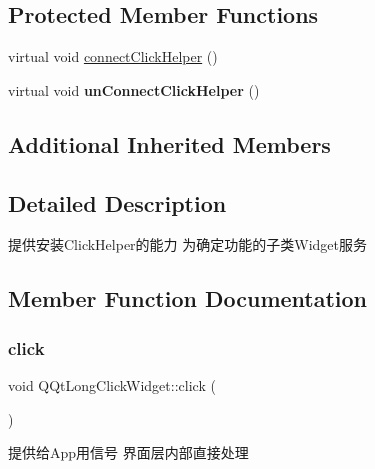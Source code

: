 \subsection*{Protected Member Functions}
\begin{DoxyCompactItemize}
\item 
virtual void \mbox{\hyperlink{class_q_qt_long_click_widget_acd01d09ecce47c27d46173fe552799cb}{connect\+Click\+Helper}} ()
\item 
\mbox{\label{class_q_qt_long_click_widget_a3b4240f8c33cd2fe51287b06e91f37ff}} 
virtual void {\bfseries un\+Connect\+Click\+Helper} ()
\end{DoxyCompactItemize}
\subsection*{Additional Inherited Members}


\subsection{Detailed Description}
提供安装\+Click\+Helper的能力 为确定功能的子类\+Widget服务 

\subsection{Member Function Documentation}
\mbox{\label{class_q_qt_long_click_widget_ab4994923edc5e1b1ac3c70ad122f496e}} 
\subsubsection{\texorpdfstring{click}{click}}
{\footnotesize\ttfamily void Q\+Qt\+Long\+Click\+Widget\+::click (\begin{DoxyParamCaption}{ }\end{DoxyParamCaption})\hspace{0.3cm}{\ttfamily [signal]}}

提供给\+App用信号 界面层内部直接处理 \mbox{\label{class_q_qt_long_click_widget_acd01d09ecce47c27d46173fe552799cb}} 

